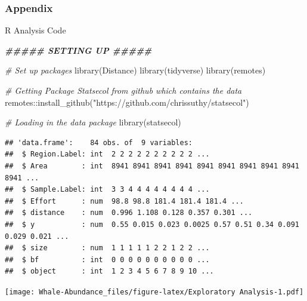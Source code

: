 \documentclass[
  12pt,
]{article}
\newenvironment{Shaded}{\begin{snugshade}}{\end{snugshade}}
\newcommand{\CommentTok}[1]{\textcolor[rgb]{0.56,0.35,0.01}{\textit{#1}}}
\newcommand{\DocumentationTok}[1]{\textcolor[rgb]{0.56,0.35,0.01}{\textbf{\textit{#1}}}}
\newcommand{\FunctionTok}[1]{\textcolor[rgb]{0.00,0.00,0.00}{#1}}
\newcommand{\NormalTok}[1]{#1}
\newcommand{\SpecialCharTok}[1]{\textcolor[rgb]{0.00,0.00,0.00}{#1}}
\newcommand{\StringTok}[1]{\textcolor[rgb]{0.31,0.60,0.02}{#1}}
\begin{document}
\hypertarget{appendix}{%
\subsubsection{Appendix}\label{appendix}}

R Analysis Code

\begin{Shaded}
\begin{Highlighting}[]
\DocumentationTok{\#\#\#\#\#    SETTING UP    \#\#\#\#\#}

\CommentTok{\# Set up packages }
\FunctionTok{library}\NormalTok{(Distance)}
\FunctionTok{library}\NormalTok{(tidyverse)}
\FunctionTok{library}\NormalTok{(remotes)}

\CommentTok{\# Getting Package Statsecol from github which contains the data}
\NormalTok{remotes}\SpecialCharTok{::}\FunctionTok{install\_github}\NormalTok{(}\StringTok{"https://github.com/chrissuthy/statsecol"}\NormalTok{)}

\CommentTok{\# Loading in the data package}
\FunctionTok{library}\NormalTok{(statsecol)}
\end{Highlighting}
\end{Shaded}

\begin{verbatim}
## 'data.frame':    84 obs. of  9 variables:
##  $ Region.Label: int  2 2 2 2 2 2 2 2 2 2 ...
##  $ Area        : int  8941 8941 8941 8941 8941 8941 8941 8941 8941 8941 ...
##  $ Sample.Label: int  3 3 4 4 4 4 4 4 4 4 ...
##  $ Effort      : num  98.8 98.8 181.4 181.4 181.4 ...
##  $ distance    : num  0.996 1.108 0.128 0.357 0.301 ...
##  $ y           : num  0.55 0.015 0.023 0.0025 0.57 0.51 0.34 0.091 0.029 0.021 ...
##  $ size        : num  1 1 1 1 1 2 2 1 2 2 ...
##  $ bf          : int  0 0 0 0 0 0 0 0 0 0 ...
##  $ object      : int  1 2 3 4 5 6 7 8 9 10 ...
\end{verbatim}

\texttt{[image: Whale-Abundance\_files/figure-latex/Exploratory Analysis-1.pdf]}
\end{document}
